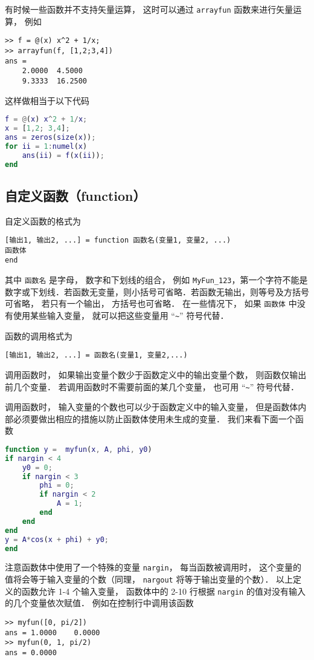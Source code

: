 有时候一些函数并不支持矢量运算， 这时可以通过 \verb|arrayfun| 函数来进行矢量运算， 例如
\begin{lstlisting}[language=matlabC]
>> f = @(x) x^2 + 1/x;
>> arrayfun(f, [1,2;3,4])
ans =
    2.0000  4.5000
    9.3333  16.2500
\end{lstlisting}
这样做相当于以下代码

\begin{lstlisting}[language=matlab]
f = @(x) x^2 + 1/x;
x = [1,2; 3,4];
ans = zeros(size(x));
for ii = 1:numel(x)
    ans(ii) = f(x(ii));
end
\end{lstlisting}

\subsection{自定义函数（function）}
自定义函数的格式为
\begin{lstlisting}[language=matlabC]
[输出1, 输出2, ...] = function 函数名(变量1, 变量2, ...)
函数体
end
\end{lstlisting}

其中 \verb|函数名| 是字母， 数字和下划线的组合， 例如 \verb|MyFun_123|，第一个字符不能是数字或下划线．若函数无变量，则小括号可省略．若函数无输出，则等号及方括号可省略， 若只有一个输出， 方括号也可省略． 在一些情况下， 如果 \verb|函数体| 中没有使用某些输入变量， 就可以把这些变量用 “\verb|~|” 符号代替．

函数的调用格式为
\begin{lstlisting}[language=matlabC]
[输出1, 输出2, ...] = 函数名(变量1, 变量2,...)
\end{lstlisting}
调用函数时， 如果输出变量个数少于函数定义中的输出变量个数， 则函数仅输出前几个变量． 若调用函数时不需要前面的某几个变量， 也可用 “\verb|~|” 符号代替．

调用函数时， 输入变量的个数也可以少于函数定义中的输入变量， 但是函数体内部必须要做出相应的措施以防止函数体使用未生成的变量． 我们来看下面一个函数

\begin{lstlisting}[language=matlab]
function y =  myfun(x, A, phi, y0)
if nargin < 4
    y0 = 0;
    if nargin < 3
        phi = 0;
        if nargin < 2
            A = 1;
        end
    end
end
y = A*cos(x + phi) + y0;
end
\end{lstlisting}

注意函数体中使用了一个特殊的变量 \verb|nargin|， 每当函数被调用时， 这个变量的值将会等于输入变量的个数（同理， \verb|nargout| 将等于输出变量的个数）． 以上定义的函数允许 1-4 个输入变量， 函数体中的 2-10 行根据 \verb|nargin| 的值对没有输入的几个变量依次赋值． 例如在控制行中调用该函数
\begin{lstlisting}[language=matlabC]
>> myfun([0, pi/2])
ans = 1.0000    0.0000
>> myfun(0, 1, pi/2)
ans = 0.0000
\end{lstlisting}

